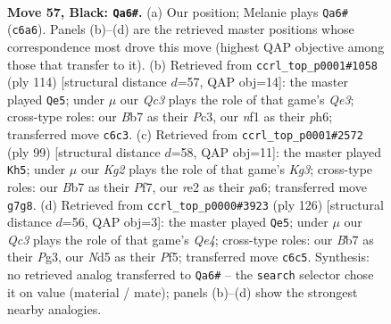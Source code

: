 \documentclass[11pt]{article}
\begin{document}
\clearpage

\begin{figure}[p]\centering
\begin{subfigure}{0.46\textwidth}\centering
\resizebox{\linewidth}{!}{%
\newchessgame
\chessboard[
  setfen={8/1b3pk1/2q3p1/K2n4/3R3P/8/4R2P/5N2 b - - 22 57},
  showmover=false,
  pgfstyle=straightmove, color=movearrow, markmove={c6-a6}
]}
\caption{}
\end{subfigure}\hfill
\begin{subfigure}{0.46\textwidth}\centering
\resizebox{\linewidth}{!}{%
\newchessgame
\chessboard[
  setfen={6k1/3q4/3r2pp/8/3N1P1P/2P1Q3/6PK/8 w - - 1 58},
  showmover=false,
  pgfstyle=straightmove, color=movearrow, markmove={e3-e5}
]}
\caption{}
\end{subfigure}
\\[4pt]
\begin{subfigure}{0.46\textwidth}\centering
\resizebox{\linewidth}{!}{%
\newchessgame
\chessboard[
  setfen={8/q4p2/P5kp/8/3n4/6P1/1Q3P2/6K1 b - - 14 50},
  showmover=false,
  pgfstyle=straightmove, color=movearrow, markmove={g6-h5}
]}
\caption{}
\end{subfigure}\hfill
\begin{subfigure}{0.46\textwidth}\centering
\resizebox{\linewidth}{!}{%
\newchessgame
\chessboard[
  setfen={1r5k/5rp1/7p/5P1P/4Q1K1/6P1/8/8 w - - 17 64},
  showmover=false,
  pgfstyle=straightmove, color=movearrow, markmove={e4-e5}
]}
\caption{}
\end{subfigure}
\caption{\textbf{Move 57, Black: \texttt{Qa6\#}.} (a) Our position; Melanie plays \texttt{Qa6\#} (\texttt{c6a6}). Panels (b)--(d) are the retrieved master positions whose correspondence most drove this move (highest QAP objective among those that transfer to it). (b) Retrieved from \texttt{ccrl\_top\_p0001\#1058} (ply 114) [structural distance $d$=57, QAP obj=14]: the master played \texttt{Qe5}; under $\mu$ our \emph{Qc3} plays the role of that game's \emph{Qe3}; cross-type roles: our \emph{B}b7 as their \emph{P}c3, our \emph{n}f1 as their \emph{p}h6; transferred move \texttt{c6c3}. (c) Retrieved from \texttt{ccrl\_top\_p0001\#2572} (ply 99) [structural distance $d$=58, QAP obj=11]: the master played \texttt{Kh5}; under $\mu$ our \emph{Kg2} plays the role of that game's \emph{Kg3}; cross-type roles: our \emph{B}b7 as their \emph{P}f7, our \emph{r}e2 as their \emph{p}a6; transferred move \texttt{g7g8}. (d) Retrieved from \texttt{ccrl\_top\_p0000\#3923} (ply 126) [structural distance $d$=56, QAP obj=3]: the master played \texttt{Qe5}; under $\mu$ our \emph{Qc3} plays the role of that game's \emph{Qe4}; cross-type roles: our \emph{B}b7 as their \emph{P}g3, our \emph{N}d5 as their \emph{P}f5; transferred move \texttt{c6c5}. Synthesis: no retrieved analog transferred to \texttt{Qa6\#} -- the \texttt{search} selector chose it on value (material / mate); panels (b)--(d) show the strongest nearby analogies.}
\label{fig:thought-m113}
\end{figure}
\end{document}
